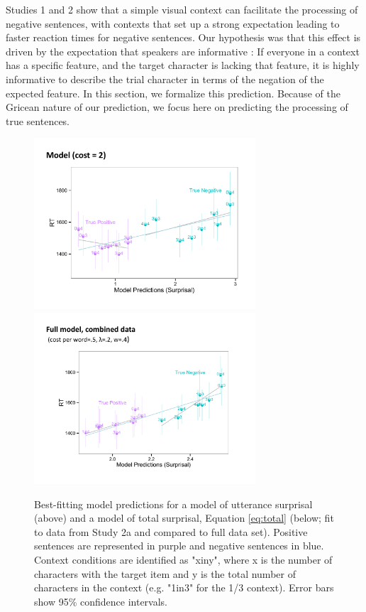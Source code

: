 \documentclass[10pt,letterpaper]{article}
\begin{document}
Studies 1 and 2 show that a simple visual context can facilitate the processing of negative sentences, with contexts that set up a strong expectation leading to faster reaction times for negative sentences.  Our hypothesis was that this effect is driven by the expectation that speakers are informative \cite{grice1975,frank2012}: If everyone in a context has a specific feature, and the target character is lacking that feature, it is highly informative to describe the trial character in terms of the negation of the expected feature. In this section, we formalize this prediction. Because of the Gricean nature of our prediction, we focus here on predicting the processing of true sentences.   


\begin{figure}[t]
\begin{center} 
\includegraphics[width=3.25in]{figures/model1_comparison.pdf}
\includegraphics[width=3.25in]{figures/model2_comparison.pdf}
\caption{\label{fig:model1_sims} Best-fitting model predictions for a model of utterance surprisal (above) and a model of total surprisal, Equation \ref{eq:total} (below; fit to data from Study 2a and compared to full data set).  Positive sentences are represented in purple and negative sentences in blue.  Context conditions are identified as "xiny", where x is the number of characters with the target item and y is the total number of characters in the context (e.g. "1in3" for the 1/3 context).  Error bars show 95\% confidence intervals.}
\end{center} 
\end{figure}
\end{document}
